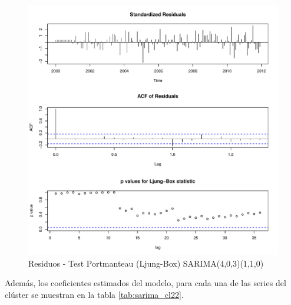 \documentclass[12pt,oneside]{book}\usepackage[]{graphicx}\usepackage[]{color}
\makeatletter
\def\maxwidth{ %
  \ifdim\Gin@nat@width>\linewidth
    \linewidth
  \else
    \Gin@nat@width
  \fi
}
\newenvironment{knitrout}{}{} %
\theoremstyle{definition} %
\makeatother
\begin{document}
\begin{knitrout}
\color{fgcolor}\begin{figure}[h]

{\centering \includegraphics[width=\maxwidth]{figure/unnamed-chunk-79-1} 

}

\caption[Residuos - Test Portmanteau (Ljung-Box) SARIMA(4,0,3)(1,1,0)]{Residuos - Test Portmanteau (Ljung-Box) SARIMA(4,0,3)(1,1,0)}\label{fig:unnamed-chunk-79}
\end{figure}


\end{knitrout}


Además, los coeficientes estimados del modelo, para cada una de las series del clúster se muestran en la tabla \ref{tab:sarima_cl22}.
\end{document}
